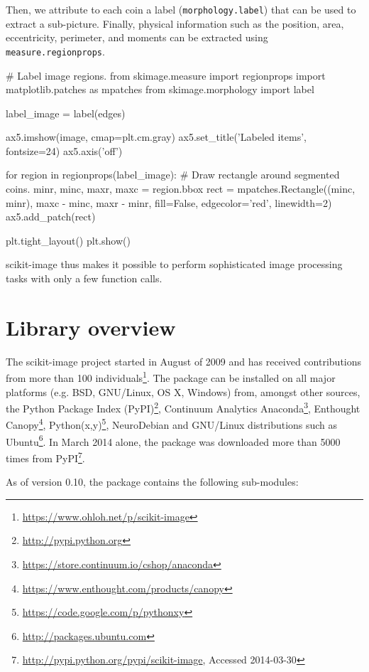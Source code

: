 \documentclass[fleqn,12pt]{wlpeerj}
\begin{document}
Then, we attribute to each coin a label (\texttt{morphology.label}) that can be used to extract a sub-picture. Finally, physical information such as the position, area, eccentricity, perimeter, and moments can be extracted using \texttt{measure.regionprops}.

\begin{python}
# Label image regions.
from skimage.measure import regionprops
import matplotlib.patches as mpatches
from skimage.morphology import label

label_image = label(edges)

ax5.imshow(image, cmap=plt.cm.gray)
ax5.set_title('Labeled items', fontsize=24)
ax5.axis('off')

for region in regionprops(label_image):
# Draw rectangle around segmented coins.
minr, minc, maxr, maxc = region.bbox
rect = mpatches.Rectangle((minc, minr),
maxc - minc,
maxr - minr,
fill=False,
edgecolor='red',
linewidth=2)
ax5.add_patch(rect)

plt.tight_layout()
plt.show()
\end{python}

scikit-image thus makes it possible to perform sophisticated image processing tasks with only a few function calls.



\section*{Library overview}
\label{library-contents}

The scikit-image project started in August of 2009 and has received contributions from more than 100 individuals\footnote{\url{https://www.ohloh.net/p/scikit-image}}.  The package can be installed on all major platforms (e.g. BSD, GNU/Linux, OS X, Windows) from, amongst other sources, the Python Package Index (PyPI)\footnote{\url{http://pypi.python.org}}, Continuum Analytics Anaconda\footnote{\url{https://store.continuum.io/cshop/anaconda}}, Enthought Canopy\footnote{\url{https://www.enthought.com/products/canopy}}, Python(x,y)\footnote{\url{https://code.google.com/p/pythonxy}}, NeuroDebian \citep{neurodebian} and GNU/Linux distributions such as Ubuntu\footnote{\url{http://packages.ubuntu.com}}. In March 2014 alone, the package was downloaded more than 5000 times from PyPI\footnote{\url{http://pypi.python.org/pypi/scikit-image}, Accessed 2014-03-30}.

As of version 0.10, the package contains the following sub-modules:
\end{document}
